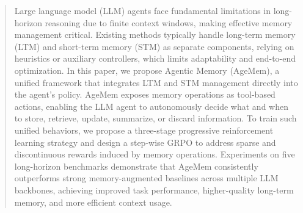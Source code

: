 \begin{abstract}
Large language model (LLM) agents face fundamental limitations in long-horizon reasoning due to finite context windows, making effective memory management critical. Existing methods typically handle long-term memory (LTM) and short-term memory (STM) as separate components, relying on heuristics or auxiliary controllers, which limits adaptability and end-to-end optimization. In this paper, we propose Agentic Memory (AgeMem), a unified framework that integrates LTM and STM management directly into the agent’s policy. AgeMem exposes memory operations as tool-based actions, enabling the LLM agent to autonomously decide what and when to store, retrieve, update, summarize, or discard information. To train such unified behaviors, we propose a three-stage progressive reinforcement learning strategy and design a step-wise GRPO to address sparse and discontinuous rewards induced by memory operations. Experiments on five long-horizon benchmarks demonstrate that AgeMem consistently outperforms strong memory-augmented baselines across multiple LLM backbones, achieving improved task performance, higher-quality long-term memory, and more efficient context usage.
\end{abstract}